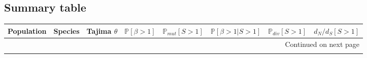 \documentclass{article}
\newcommand{\dn}{d_N}
\newcommand{\ds}{d_S}
\newcommand{\dnds}{\dn / \ds}
\newcommand{\Sphy}{S}
\newcommand{\Spop}{\beta}
\begin{document}
    \subsection{Summary table}\label{subsec:summary-table-mutsel}
    \begin{center}
        \scriptsize
        \begin{longtable}{|l|l|r|r|r|r|r|r|}
            \toprule
            Population           & Species             & Tajima $\theta$ & $\mathbb{P} [ \Spop > 1 ]$ & $\mathbb{P}_{mut}[\Sphy > 1]$ & $\mathbb{P} [ \Spop > 1  | \Sphy > 1]$ & $\mathbb{P}_{div}[\Sphy > 1]$ & $\dnds[\Sphy > 1]$ \\
            \midrule
            \endhead
            \midrule
            \multicolumn{8}{r}{{Continued on next page}} \\
            \midrule
            \endfoot


\end{longtable}
\end{center}
\end{document}
